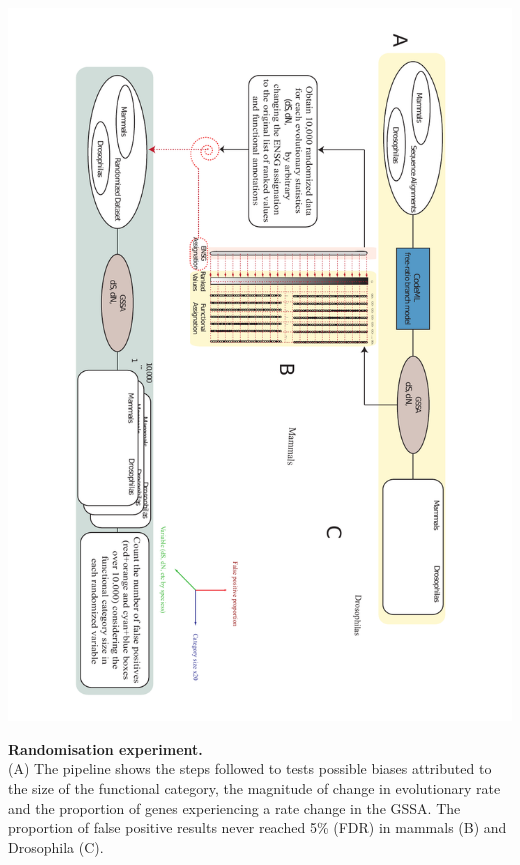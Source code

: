 \begin{FPfigure}
\centering 
\includegraphics[width=\textwidth]{tex_source/figures/gssa/gssa_simulations.pdf}
\caption[Randomisation experiment.]{{\bf Randomisation experiment.} \\(A) The pipeline shows the steps followed to tests possible biases attributed to the size of the functional category, the magnitude of change in evolutionary rate and the proportion of genes experiencing a rate change in the GSSA. The proportion of false positive results never reached 5\% (FDR) in mammals (B) and Drosophila (C).}
\label{fig:gssa_simul}
\end{FPfigure}

